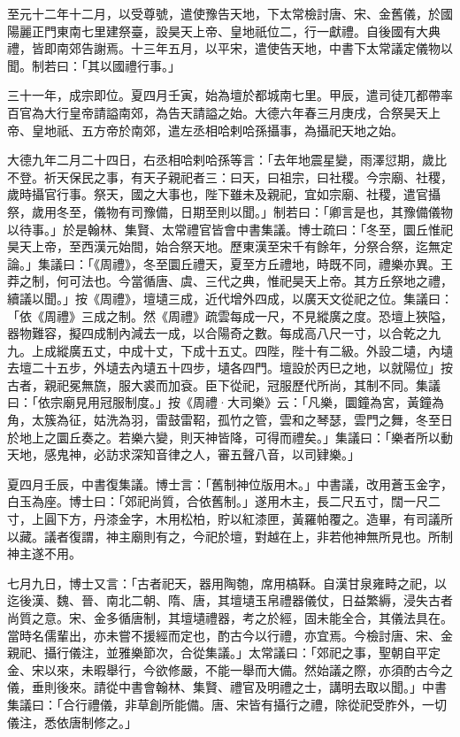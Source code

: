 \begin{pinyinscope}
 至元十二年十二月，以受尊號，遣使豫告天地，下太常檢討唐、宋、金舊儀，於國陽麗正門東南七里建祭臺，設昊天上帝、皇地祇位二，行一獻禮。自後國有大典禮，皆即南郊告謝焉。十三年五月，以平宋，遣使告天地，中書下太常議定儀物以聞。制若曰：「其以國禮行事。」



 三十一年，成宗即位。夏四月壬寅，始為壇於都城南七里。甲辰，遣司徒兀都帶率百官為大行皇帝請謚南郊，為告天請謚之始。大德六年春三月庚戌，合祭昊天上帝、皇地祇、五方帝於南郊，遣左丞相哈剌哈孫攝事，為攝祀天地之始。



 大德九年二月二十四日，右丞相哈剌哈孫等言：「去年地震星變，雨澤愆期，歲比不登。祈天保民之事，有天子親祀者三：曰天，曰祖宗，曰社稷。今宗廟、社稷，歲時攝官行事。祭天，國之大事也，陛下雖未及親祀，宜如宗廟、社稷，遣官攝祭，歲用冬至，儀物有司豫備，日期至則以聞。」制若曰：「卿言是也，其豫備儀物以待事。」於是翰林、集賢、太常禮官皆會中書集議。博士疏曰：「冬至，圜丘惟祀昊天上帝，至西漢元始間，始合祭天地。歷東漢至宋千有餘年，分祭合祭，迄無定論。」集議曰：「《周禮》，冬至圜丘禮天，夏至方丘禮地，時既不同，禮樂亦異。王莽之制，何可法也。今當循唐、虞、三代之典，惟祀昊天上帝。其方丘祭地之禮，續議以聞。」按《周禮》，壇壝三成，近代增外四成，以廣天文從祀之位。集議曰：「依《周禮》三成之制。然《周禮》疏雲每成一尺，不見縱廣之度。恐壇上狹隘，器物難容，擬四成制內減去一成，以合陽奇之數。每成高八尺一寸，以合乾之九九。上成縱廣五丈，中成十丈，下成十五丈。四陛，陛十有二級。外設二壝，內壝去壇二十五步，外壝去內壝五十四步，壝各四門。壇設於丙巳之地，以就陽位」按古者，親祀冕無旒，服大裘而加袞。臣下從祀，冠服歷代所尚，其制不同。集議曰：「依宗廟見用冠服制度。」按《周禮·大司樂》云：「凡樂，圜鐘為宮，黃鐘為角，太簇為征，姑洗為羽，雷鼓雷鞀，孤竹之管，雲和之琴瑟，雲門之舞，冬至日於地上之圜丘奏之。若樂六變，則天神皆降，可得而禮矣。」集議曰：「樂者所以動天地，感鬼神，必訪求深知音律之人，審五聲八音，以司肄樂。」



 夏四月壬辰，中書復集議。博士言：「舊制神位版用木。」中書議，改用蒼玉金字，白玉為座。博士曰：「郊祀尚質，合依舊制。」遂用木主，長二尺五寸，闊一尺二寸，上圓下方，丹漆金字，木用松柏，貯以紅漆匣，黃羅帕覆之。造畢，有司議所以藏。議者復謂，神主廟則有之，今祀於壇，對越在上，非若他神無所見也。所制神主遂不用。



 七月九日，博士又言：「古者祀天，器用陶匏，席用槁鞂。自漢甘泉雍畤之祀，以迄後漢、魏、晉、南北二朝、隋、唐，其壇壝玉帛禮器儀仗，日益繁縟，浸失古者尚質之意。宋、金多循唐制，其壇壝禮器，考之於經，固未能全合，其儀法具在。當時名儒輩出，亦未嘗不援經而定也，酌古今以行禮，亦宜焉。今檢討唐、宋、金親祀、攝行儀注，並雅樂節次，合從集議。」太常議曰：「郊祀之事，聖朝自平定金、宋以來，未暇舉行，今欲修嚴，不能一舉而大備。然始議之際，亦須酌古今之儀，垂則後來。請從中書會翰林、集賢、禮官及明禮之士，講明去取以聞。」中書集議曰：「合行禮儀，非草創所能備。唐、宋皆有攝行之禮，除從祀受胙外，一切儀注，悉依唐制修之。」




\end{pinyinscope}
